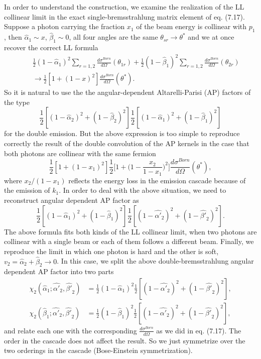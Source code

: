 In order to understand the construction, we examine the realization of the LL collinear limit in the exact single-bremsstrahlung matrix element of eq. (7.17). Suppose a photon carrying the fraction $x_1$ of the beam energy is collinear with $p_1$, then $\hat{\alpha}_1\sim x$, $\hat{\beta}_1
\sim0$, all four angles are the same $\theta_{sr}\to\theta^\ast$ and we at once recover the correct LL formula
\begin{eqnarray*}
&&\frac{1}{2}(1-\hat{\alpha}_1)^2\sum_{r=1,2}\frac{d\sigma^{Born}}{d\Omega}(\theta_{1r})+\frac{1}{2}(1-\hat{\beta}_1)^2\sum_{r=1,2}\frac{d\sigma^{Born}}{d\Omega}(\theta_{2r})\nonumber\\
&&\to\frac{1}{2}[1+(1-x)^2]\frac{d\sigma^{Born}}{d\Omega}(\theta^\ast).
\end{eqnarray*}
So it is natural to use the the angular-dependent Altarelli-Parisi (AP) factors of the type 
\begin{equation*}
\frac{1}{2}[(1-\hat{\alpha}_2)^2+(1-\hat{\beta}_2)^2]\frac{1}{2}[(1-\hat{\alpha}_1)^2+(1-\hat{\beta}_1)^2]
\end{equation*}
for the double emission. But the above expression is too simple to reproduce correctly the result of the double convolution of the AP kernels in the case that both photons are collinear with the same fermion
\begin{equation*}
\frac{1}{2}[1+(1-x_1)^2]\frac{1}{2}\biggl[ 1+\biggl( 1-\frac{x_2}{1-x_1} \biggr)^2 \biggr]\frac{d\sigma^{Born}}{d\Omega}(\theta^\ast),
\end{equation*}
where $x_2/(1-x_1)$ reflects the energy loss in the emission cascade because of the emission of $k_1$. In order to deal with the above situation, we need to reconstruct angular dependent AP factor as 
\begin{equation*}
\frac{1}{2}[(1-\hat{\alpha}_1)^2+(1-\hat{\beta}_1)^2]\frac{1}{2}[(1-\hat{\alpha'}_2)^2+(1-\hat{\beta'}_2)^2].
\end{equation*}
The above formula fits both kinds of the LL collinear limit, when two photons are collinear with a single beam or each of them follows a different beam. Finally, we reproduce the limit in which one photon is hard and the other is soft, $v_2=\hat{\alpha}_2+\hat{\beta}_2\to 0$. In this case, we split the above double-bremsstrahlung angular dependent AP factor into two parts
\begin{align}
\chi_2(\hat{\alpha}_1;\hat{\alpha'}_2,\hat{\beta'}_2)&=\frac{1}{2}(1-\hat{\alpha}_1)^2\frac{1}{2}[(1-\hat{\alpha'}_2)^2+(1-\hat{\beta'}_2)^2],\nonumber\\
\chi_2(\hat{\beta}_1;\hat{\alpha'}_2,\hat{\beta'}_2)&=\frac{1}{2}(1-\hat{\beta}_1)^2\frac{1}{2}[(1-\hat{\alpha'}_2)^2+(1-\hat{\beta'}_2)^2],
\end{align}
and relate each one with the corresponding $\frac{d\sigma^{Born}}{d\Omega}$ as we did in eq. (7.17). The order in the cascade does not affect the result. So we just symmetrize over the two orderings in the cascade (Bose-Einstein symmetrization).

